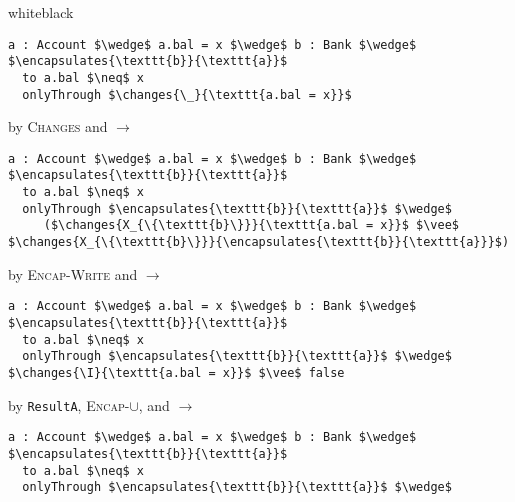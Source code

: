 \begin{proofBox}{white}{black}
\footnotesize
\begin{minipage}{0.75\textwidth}
\begin{lstlisting}[language = Chainmail, mathescape=true, frame=single]
a : Account $\wedge$ a.bal = x $\wedge$ b : Bank $\wedge$ $\encapsulates{\texttt{b}}{\texttt{a}}$
  to a.bal $\neq$ x
  onlyThrough $\changes{\_}{\texttt{a.bal = x}}$
\end{lstlisting}
\end{minipage}
\begin{minipage}{0.24\textwidth}
\scriptsize
\hfill by \textsc{Changes} and $\longrightarrow$
\end{minipage}
\begin{minipage}{0.75\textwidth}
\begin{lstlisting}[language = Chainmail, mathescape=true]
a : Account $\wedge$ a.bal = x $\wedge$ b : Bank $\wedge$ $\encapsulates{\texttt{b}}{\texttt{a}}$
  to a.bal $\neq$ x
  onlyThrough $\encapsulates{\texttt{b}}{\texttt{a}}$ $\wedge$ 
     ($\changes{X_{\{\texttt{b}\}}}{\texttt{a.bal = x}}$ $\vee$ $\changes{X_{\{\texttt{b}\}}}{\encapsulates{\texttt{b}}{\texttt{a}}}$)
\end{lstlisting}
\end{minipage}
\begin{minipage}{0.24\textwidth}
\scriptsize
\hfill by \textsc{Encap-Write} and $\longrightarrow$
\end{minipage}
\begin{minipage}{0.75\textwidth}
\begin{lstlisting}[language = Chainmail, mathescape=true]
a : Account $\wedge$ a.bal = x $\wedge$ b : Bank $\wedge$ $\encapsulates{\texttt{b}}{\texttt{a}}$
  to a.bal $\neq$ x
  onlyThrough $\encapsulates{\texttt{b}}{\texttt{a}}$ $\wedge$ $\changes{\I}{\texttt{a.bal = x}}$ $\vee$ false
\end{lstlisting}
\end{minipage}
\begin{minipage}{0.24\textwidth}
\scriptsize
\hfill by \texttt{ResultA}, \textsc{Encap-}$\cup$, and $\longrightarrow$
\end{minipage}
\begin{minipage}{0.75\textwidth}
\begin{lstlisting}[language = Chainmail, mathescape=true]
a : Account $\wedge$ a.bal = x $\wedge$ b : Bank $\wedge$ $\encapsulates{\texttt{b}}{\texttt{a}}$
  to a.bal $\neq$ x
  onlyThrough $\encapsulates{\texttt{b}}{\texttt{a}}$ $\wedge$ 

\end{lstlisting}
\end{minipage}
\end{proofBox}
